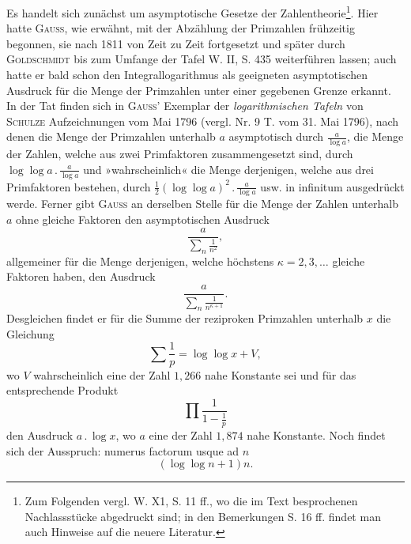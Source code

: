 Es handelt sich zunächst um asymptotische Gesetze der Zahlentheorie\footnote{Zum Folgenden vergl. W. X1, S. 11 ff., wo die im Text besprochenen Nachlassstücke abgedruckt sind; in den Bemerkungen S. 16 ff. findet man auch Hinweise auf die neuere Literatur.}. Hier hatte \textsc{Gauss}, wie erwähnt, mit der Abzählung der Primzahlen frühzeitig begonnen, sie nach 1811 von Zeit zu Zeit fortgesetzt und später durch \textsc{Goldschmidt} bis zum Umfange der Tafel W. II, S. 435 weiterführen lassen; auch hatte er bald schon den Integrallogarithmus als geeigneten asymptotischen Ausdruck für die Menge der Primzahlen unter einer gegebenen Grenze erkannt. In der Tat finden sich in \textsc{Gauss}’ Exemplar der \textit{logarithmischen Tafeln} von \textsc{Schulze} Aufzeichnungen vom Mai 1796 (vergl. Nr. 9 T. vom 31. Mai 1796), nach denen die Menge der Primzahlen unterhalb \(a\) asymptotisch durch \(\frac{a}{\log a}\), die Menge der Zahlen, welche aus zwei Primfaktoren zusammengesetzt sind, durch \(\log\log a\mathbin{.}\frac{a}{\log a}\) und »wahrscheinlich« die Menge derjenigen, welche aus drei Primfaktoren bestehen, durch \(\frac12(\log\log a)^2\mathbin{.}\frac{a}{\log a}\) usw. in infinitum ausgedrückt werde. Ferner gibt \textsc{Gauss} an derselben Stelle für die Menge der Zahlen unterhalb \(a\) ohne gleiche Faktoren den asymptotischen Ausdruck
\[
\frac{a}{\displaystyle\sum_n\frac1{n^2}},
\]
allgemeiner für die Menge derjenigen, welche höchstens \(\kappa=2,3,\ldots\) gleiche Faktoren haben, den Ausdruck
\[
\frac{a}{\displaystyle\sum_n\frac1{n^{\kappa+1}}}.
\]
Desgleichen findet er für die Summe der reziproken Primzahlen unterhalb \(x\) die Gleichung
\[
\sum\frac1p=\log\log x+V,
\]
\newpage{}
\noindent wo \(V\) wahrscheinlich eine der Zahl \(1{,}266\) nahe Konstante sei und für das entsprechende Produkt
\[
\prod\frac1{1-\frac1p}
\]
den Ausdruck \(a\mathbin{.}\log x\), wo \(a\) eine der Zahl \(1{,}874\) nahe Konstante. Noch findet sich der Ausspruch: numerus factorum usque ad \(n\)
\[
(\log\log n+1)n.
\]

